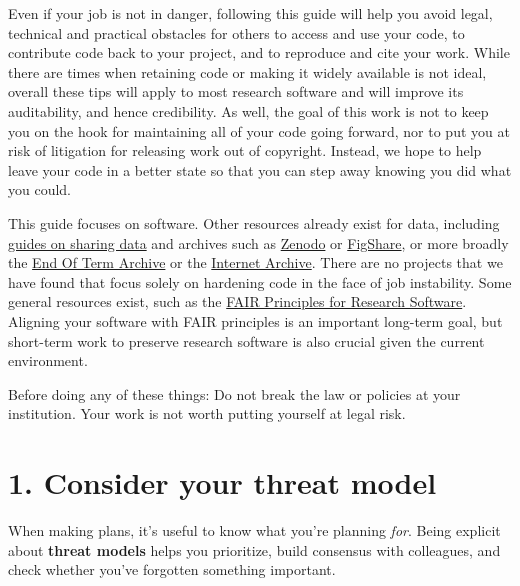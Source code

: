 \documentclass[10pt,letterpaper]{article}
\begin{document}
Even if your job is not in danger,
following this guide will help you avoid legal, technical and practical obstacles
for others to access and use your code,
to contribute code back to your project,
and to reproduce and cite your work.
While there are times when retaining code or making it widely available is not ideal,
overall these tips will apply to most research software
and will improve its auditability, and hence credibility.
As well,
the goal of this work is not to keep you on the hook for maintaining all of your code going forward,
nor to put you at risk of litigation for releasing work out of copyright.
Instead, we hope to help leave your code in a better state
so that you can step away knowing you did what you could.

This guide focuses on software.
Other resources already exist for data,
including \href{https://www.nature.com/articles/d41586-023-01929-7}{guides on sharing data}
and archives such as \href{https://zenodo.org/}{Zenodo} or \href{https://figshare.com/}{FigShare},
or more broadly the \href{https://eotarchive.org/}{End Of Term Archive}
or the \href{http://archive.org/}{Internet Archive}.
There are no projects that we have found that focus solely on hardening code in the face of job instability.
Some general resources exist,
such as the \href{https://pmc.ncbi.nlm.nih.gov/articles/PMC9562067/}{FAIR Principles for Research Software}.
Aligning your software with FAIR principles is an important long-term goal,
but short-term work to preserve research software is also crucial given the current environment.

Before doing any of these things: Do not break the law or policies at
your institution. Your work is not worth putting yourself at legal risk.

\section*{1. Consider your threat model}

When making plans, it's useful to know what you're planning \emph{for}.
Being explicit about \textbf{threat models} helps you prioritize,
build consensus with colleagues,
and check whether you've forgotten something important.
\end{document}
